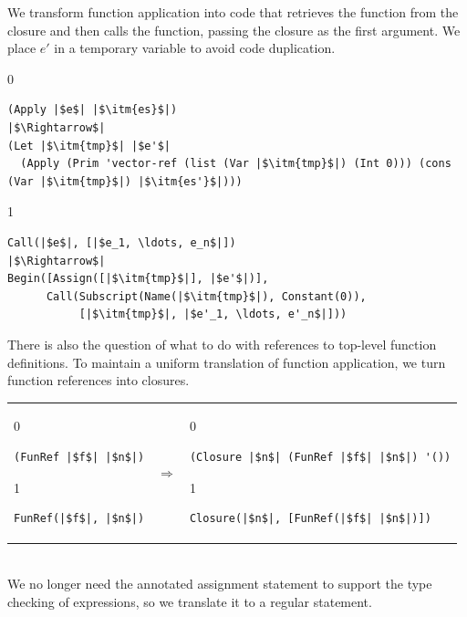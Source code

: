 \documentclass[7x10]{TimesAPriori_MIT}%
\def\racketEd{0}
\def\pythonEd{1}
\def\edition{0}
\numberwithin{theorem}{chapter}
\numberwithin{definition}{chapter}
\numberwithin{equation}{chapter}
\begin{document}
We transform function application into code that retrieves the
function from the closure and then calls the function, passing the
closure as the first argument. We place $e'$ in a temporary variable
to avoid code duplication.
\begin{center}
\begin{minipage}{\textwidth}
{\if\edition\racketEd
\begin{lstlisting}
(Apply |$e$| |$\itm{es}$|)
|$\Rightarrow$|
(Let |$\itm{tmp}$| |$e'$|
  (Apply (Prim 'vector-ref (list (Var |$\itm{tmp}$|) (Int 0))) (cons (Var |$\itm{tmp}$|) |$\itm{es'}$|)))
\end{lstlisting}
\fi}
%
{\if\edition\pythonEd
\begin{lstlisting}
Call(|$e$|, [|$e_1, \ldots, e_n$|])
|$\Rightarrow$|
Begin([Assign([|$\itm{tmp}$|], |$e'$|)],
      Call(Subscript(Name(|$\itm{tmp}$|), Constant(0)),
           [|$\itm{tmp}$|, |$e'_1, \ldots, e'_n$|]))
\end{lstlisting}
\fi}
\end{minipage}
\end{center}

There is also the question of what to do with references to top-level
function definitions. To maintain a uniform translation of function
application, we turn function references into closures.

\begin{tabular}{lll}
\begin{minipage}{0.3\textwidth}
{\if\edition\racketEd
\begin{lstlisting}
(FunRef |$f$| |$n$|)
\end{lstlisting}
\fi}
{\if\edition\pythonEd
\begin{lstlisting}
FunRef(|$f$|, |$n$|)
\end{lstlisting}
\fi}
\end{minipage}
&
$\Rightarrow$
&
\begin{minipage}{0.5\textwidth}
{\if\edition\racketEd
\begin{lstlisting}
(Closure |$n$| (FunRef |$f$| |$n$|) '())
\end{lstlisting}
\fi}
{\if\edition\pythonEd
\begin{lstlisting}
Closure(|$n$|, [FunRef(|$f$| |$n$|)])
\end{lstlisting}
\fi}
\end{minipage}
\end{tabular}  \\


We no longer need the annotated assignment statement 
to support the type checking of  expressions, so we
translate it to a regular  statement.
\end{document}

